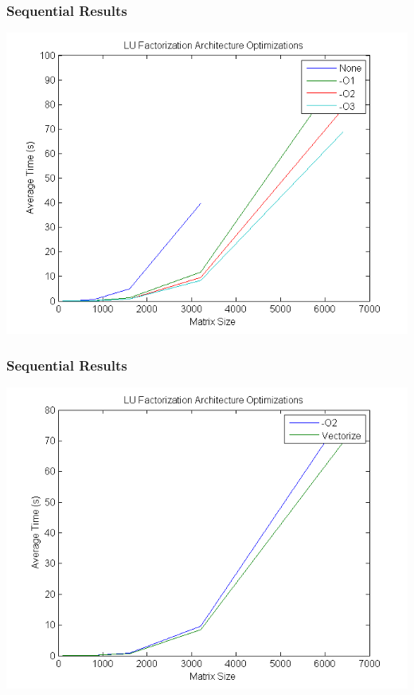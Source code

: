 \documentclass{beamer}
\begin{document}
\begin{frame}
\frametitle{Sequential Results}

\begin{center}
\includegraphics[scale=0.5]{figures/fig2}
\end{center}

\end{frame}

\begin{frame}
\frametitle{Sequential Results}

\begin{center}
\includegraphics[scale=0.5]{figures/fig3}
\end{center}

\end{frame}
\end{document}
